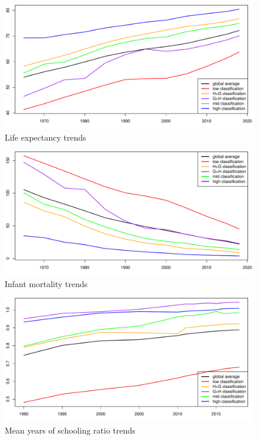\documentclass[12pt]{article}
\begin{document}


\begin{figure}[!htb]
    \centering
    \caption{Life expectancy trends}
    \label{trends_life}
    \includegraphics[width=\textwidth]{trend_life_exp_wpp.pdf}
\end{figure}
\begin{figure}[!htb]
    \centering
    \caption{Infant mortality trends}
    \label{trends_imr}
    \includegraphics[width=\textwidth]{trend_imr_wpp.pdf}
\end{figure}
\begin{figure}[!htb]
    \centering
    \caption{Mean years of schooling ratio trends}
    \label{trends_mys}
    \includegraphics[width=\textwidth]{trend_mys_ratio_hdr.pdf}
\end{figure}
\end{document}
